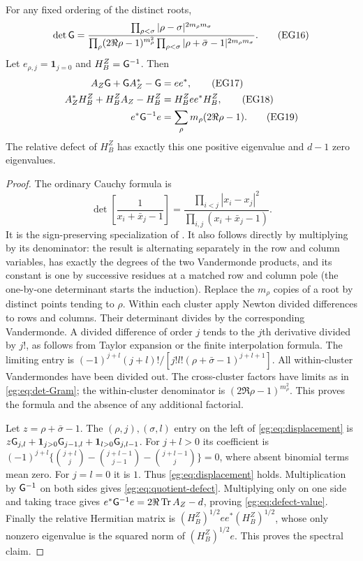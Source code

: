 \documentclass[11pt]{article}
\begin{document}
\begin{egtheorem}
\label{eg:thm:Cauchy-displacement}
For any fixed ordering of the distinct roots,
\[
 \det\mathsf G=
 \frac{\prod_{\rho<\sigma}|\rho-\sigma|^{2m_\rho m_\sigma}}
 {\prod_\rho(2\Re\rho-1)^{m_\rho^2}
  \prod_{\rho<\sigma}|\rho+\bar\sigma-1|^{2m_\rho m_\sigma}}.
 \tag{EG16}\label{eg:eq:det-Gram}
\]
Let $e_{\rho,j}=\mathbf1_{j=0}$ and $H_B^Z=\mathsf G^{-1}$. Then
\begin{align}
 A_Z\mathsf G+\mathsf G A_Z^*-\mathsf G&=ee^*,\tag{EG17}\label{eg:eq:displacement}\\
 A_Z^*H_B^Z+H_B^ZA_Z-H_B^Z&=H_B^Zee^*H_B^Z,\tag{EG18}\label{eg:eq:quotient-defect}\\
 e^*\mathsf G^{-1}e&=\sum_\rho m_\rho(2\Re\rho-1).\tag{EG19}\label{eg:eq:defect-value}
\end{align}
The relative defect of $H_B^Z$ has exactly this one positive eigenvalue
and $d-1$ zero eigenvalues.
\end{egtheorem}
\begin{proof}
The ordinary Cauchy formula is
\[
 \det\left[\frac1{x_i+\bar x_j-1}\right]
 =\frac{\prod_{i<j}|x_i-x_j|^2}{\prod_{i,j}(x_i+\bar x_j-1)}.
\]
It is the sign-preserving specialization of \cite[(1.3.14)]{eg:DLMFCauchy}.
It also follows directly by multiplying by its denominator: the
result is alternating separately in the row and column variables,
has exactly the degrees of the two Vandermonde products, and its
constant is one by successive residues at a matched row and column
pole (the one-by-one determinant starts the induction).
Replace the $m_\rho$ copies of a root by distinct points tending to
$\rho$. Within each cluster apply Newton divided differences to
rows and columns. Their determinant divides by the corresponding
Vandermonde. A divided difference of order $j$ tends to the $j$th
derivative divided by $j!$, as follows from Taylor expansion or
the finite interpolation formula. The limiting entry is
$(-1)^{j+l}(j+l)!/[j!l!(\rho+\bar\sigma-1)^{j+l+1}]$.
All within-cluster Vandermondes have been divided out. The
cross-cluster factors have limits as in \eqref{eg:eq:det-Gram}; the
within-cluster denominator is $(2\Re\rho-1)^{m_\rho^2}$. This
proves the formula and the absence of any additional factorial.

Let $z=\rho+\bar\sigma-1$. The $(\rho,j),(\sigma,l)$ entry on
the left of \eqref{eg:eq:displacement} is
$z\mathsf G_{j,l}+\mathbf1_{j>0}\mathsf G_{j-1,l}
+\mathbf1_{l>0}\mathsf G_{j,l-1}$. For $j+l>0$ its coefficient is
$(-1)^{j+l}\{\binom{j+l}{j}-\binom{j+l-1}{j-1}
-\binom{j+l-1}{j}\}=0$, where absent binomial terms mean zero.
For $j=l=0$ it is $1$. Thus \eqref{eg:eq:displacement} holds.
Multiplication by $\mathsf G^{-1}$ on both sides gives
\eqref{eg:eq:quotient-defect}. Multiplying only on one side and taking
trace gives $e^*\mathsf G^{-1}e=2\Re\operatorname{Tr} A_Z-d$, proving
\eqref{eg:eq:defect-value}. Finally the relative Hermitian matrix is
$(H_B^Z)^{1/2}ee^*(H_B^Z)^{1/2}$, whose only nonzero eigenvalue
is the squared norm of $(H_B^Z)^{1/2}e$. This proves the spectral claim.
\end{proof}
\end{document}
